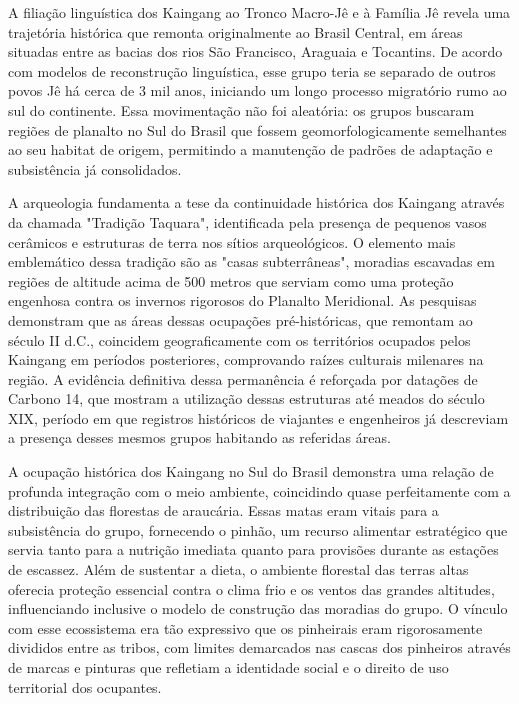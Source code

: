 \documentclass[12pt, a4paper]{article}
\begin{document}
A filiação linguística dos Kaingang ao Tronco Macro-Jê e à Família Jê revela uma trajetória histórica que remonta originalmente ao Brasil Central, em áreas situadas entre as bacias dos rios São Francisco, Araguaia e Tocantins. De acordo com modelos de reconstrução linguística, esse grupo teria se separado de outros povos Jê há cerca de 3 mil anos, iniciando um longo processo migratório rumo ao sul do continente. Essa movimentação não foi aleatória: os grupos buscaram regiões de planalto no Sul do Brasil que fossem geomorfologicamente semelhantes ao seu habitat de origem, permitindo a manutenção de padrões de adaptação e subsistência já consolidados.  

A arqueologia fundamenta a tese da continuidade histórica dos Kaingang através da chamada "Tradição Taquara", identificada pela presença de pequenos vasos cerâmicos e estruturas de terra nos sítios arqueológicos. O elemento mais emblemático dessa tradição são as "casas subterrâneas", moradias escavadas em regiões de altitude acima de 500 metros que serviam como uma proteção engenhosa contra os invernos rigorosos do Planalto Meridional. As pesquisas demonstram que as áreas dessas ocupações pré-históricas, que remontam ao século II d.C., coincidem geograficamente com os territórios ocupados pelos Kaingang em períodos posteriores, comprovando raízes culturais milenares na região. A evidência definitiva dessa permanência é reforçada por datações de Carbono 14, que mostram a utilização dessas estruturas até meados do século XIX, período em que registros históricos de viajantes e engenheiros já descreviam a presença desses mesmos grupos habitando as referidas áreas.

A ocupação histórica dos Kaingang no Sul do Brasil demonstra uma relação de profunda integração com o meio ambiente, coincidindo quase perfeitamente com a distribuição das florestas de araucária. Essas matas eram vitais para a subsistência do grupo, fornecendo o pinhão, um recurso alimentar estratégico que servia tanto para a nutrição imediata quanto para provisões durante as estações de escassez. Além de sustentar a dieta, o ambiente florestal das terras altas oferecia proteção essencial contra o clima frio e os ventos das grandes altitudes, influenciando inclusive o modelo de construção das moradias do grupo. O vínculo com esse ecossistema era tão expressivo que os pinheirais eram rigorosamente divididos entre as tribos, com limites demarcados nas cascas dos pinheiros através de marcas e pinturas que refletiam a identidade social e o direito de uso territorial dos ocupantes.
\end{document}

